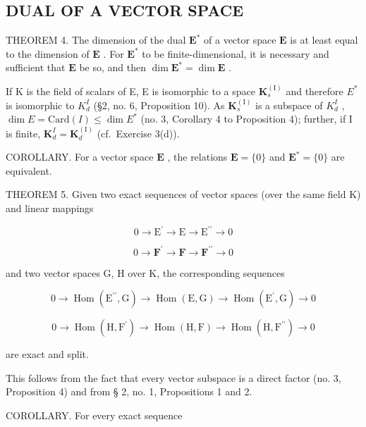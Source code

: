 \subsection{DUAL OF A VECTOR SPACE}

THEOREM 4. The dimension of the dual \(\mathbf{E}^*\) of a vector space \(\mathbf{E}\) is at least equal to the dimension of \(\mathbf{E}\) . For \(\mathbf{E}^*\) to be finite-dimensional, it is necessary and sufficient that \(\mathbf{E}\) be so, and then \(\dim \mathbf{E}^* = \dim \mathbf{E}\) .

If K is the field of scalars of E, E is isomorphic to a space \(\mathbf{K}_{s}^{\mathrm{(I)}}\) and therefore \(E^{*}\) is isomorphic to \(K_{d}^{I}\) (§2, no. 6, Proposition 10). As \(\mathbf{K}_{s}^{\mathrm{(I)}}\) is a subspace of \(K_{d}^{I}\) , \(\dim E = \text{Card}(I) \leqslant \dim E^{*}\) (no. 3, Corollary 4 to Proposition 4); further, if I is finite, \(\mathbf{K}_{d}^{I} = \mathbf{K}_{d}^{\mathrm{(I)}}\) (cf.~Exercise 3(d)).

COROLLARY. For a vector space \(\mathbf{E}\) , the relations \(\mathbf{E} = \{0\}\) and \(\mathbf{E}^{*} = \{0\}\) are equivalent.

THEOREM 5. Given two exact sequences of vector spaces (over the same field K) and linear mappings

\[
0 \rightarrow \mathrm{E} ^ {\prime} \rightarrow \mathrm{E} \rightarrow \mathrm{E} ^ {\prime \prime} \rightarrow 0
\]

\[
0 \to \mathbf {F} ^ {\prime} \to \mathbf {F} \to \mathbf {F} ^ {\prime \prime} \to 0
\]

and two vector spaces G, H over K, the corresponding sequences

\[
0 \rightarrow \operatorname{Hom} (\mathrm{E} ^ {\prime \prime}, \mathrm{G}) \rightarrow \operatorname{Hom} (\mathrm{E}, \mathrm{G}) \rightarrow \operatorname{Hom} (\mathrm{E} ^ {\prime}, \mathrm{G}) \rightarrow 0
\]

\[
0 \rightarrow \operatorname{Hom} (\mathrm{H}, \mathrm{F} ^ {\prime}) \rightarrow \operatorname{Hom} (\mathrm{H}, \mathrm{F}) \rightarrow \operatorname{Hom} (\mathrm{H}, \mathrm{F} ^ {\prime \prime}) \rightarrow 0
\]

are exact and split.

This follows from the fact that every vector subspace is a direct factor (no. 3, Proposition 4) and from § 2, no. 1, Propositions 1 and 2.

COROLLARY. For every exact sequence

